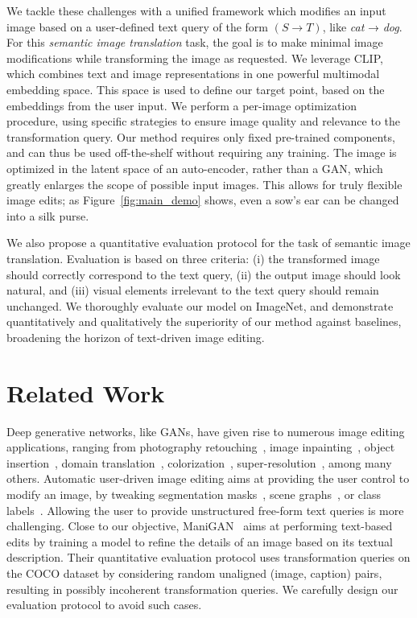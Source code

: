 We  tackle these challenges with a unified framework which modifies an input image based
 on a user-defined text query of the form $(S \rightarrow T)$, like \textit{cat} → \textit{dog}.
  For this \textit{semantic image translation} task, the goal is to make minimal image
   modifications  while transforming the image as requested.
We leverage CLIP\cite{radford21clip},  which combines text and image representations in 
one powerful multimodal embedding space. This space is used to define our target point,
 based on the embeddings from the user input. We perform a per-image optimization 
 procedure, using specific  strategies to ensure image quality and relevance to the 
 transformation query. Our method requires only fixed pre-trained components, and can 
 thus be used off-the-shelf  without  requiring any training. The image is optimized in 
 the latent space of an auto-encoder, rather than a GAN, which greatly enlarges the 
 scope of possible input images. This allows for truly flexible image edits; as 
 Figure~\ref{fig:main_demo} shows, even a sow's ear can be  changed into a silk purse. 

We also propose a quantitative evaluation protocol for the task of semantic image 
translation. 
Evaluation is based on three criteria: (i) the transformed image should correctly 
correspond to the text query, (ii) the output image should look natural,  and (iii) 
visual elements irrelevant to the text query should remain unchanged. 
We thoroughly evaluate our model on ImageNet, and  demonstrate quantitatively and 
qualitatively the superiority of our method against baselines, broadening the horizon 
of text-driven image editing.



\section{Related Work}
\label{related_work}

 Deep generative networks, like GANs, have given rise to numerous 
image editing applications, ranging from photography retouching~\cite{shi2020benchmark},
 image inpainting~\cite{yu18cvpr}, object insertion~\cite{gafni20cvpr}, 
domain translation~\cite{zhu17iccv,yu2019multi}, colorization~\cite{isola17cvpr}, 
super-resolution~\cite{johnson16eccv,ledig17cvpr},
among many others. 
Automatic user-driven image editing aims at providing the user control to modify an
 image, by tweaking segmentation masks~\cite{ling2021editgan}, scene 
 graphs~\cite{dhamo2020semantic}, or class labels~\cite{casanova21nips}. 
Allowing the user to provide unstructured  free-form text queries  is more
 challenging. 
Close to our objective,  ManiGAN~\cite{li2020manigan} aims at performing 
text-based edits by training a model to refine the details of an image based on its 
textual description. Their quantitative evaluation protocol uses transformation queries
 on the COCO dataset by considering random unaligned (image, caption) pairs, resulting 
 in possibly incoherent transformation queries.
We carefully design our evaluation protocol to  avoid such cases.


